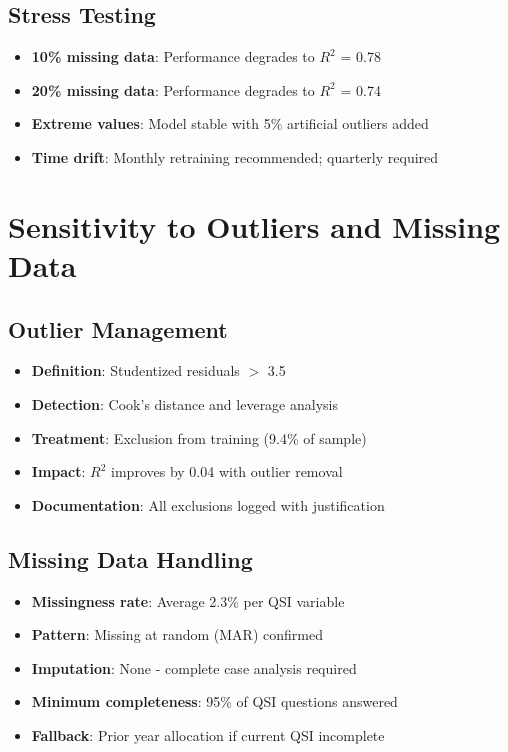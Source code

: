 \subsection{Stress Testing}

\begin{itemize}
    \item \textbf{10\% missing data}: Performance degrades to $R^2$ = 0.78
    \item \textbf{20\% missing data}: Performance degrades to $R^2$ = 0.74
    \item \textbf{Extreme values}: Model stable with 5\% artificial outliers added
    \item \textbf{Time drift}: Monthly retraining recommended; quarterly required
\end{itemize}

\section{Sensitivity to Outliers and Missing Data}

\subsection{Outlier Management}

\begin{itemize}
    \item \textbf{Definition}: Studentized residuals $>$ 3.5
    \item \textbf{Detection}: Cook's distance and leverage analysis
    \item \textbf{Treatment}: Exclusion from training (9.4\% of sample)
    \item \textbf{Impact}: $R^2$ improves by 0.04 with outlier removal
    \item \textbf{Documentation}: All exclusions logged with justification
\end{itemize}

\subsection{Missing Data Handling}

\begin{itemize}
    \item \textbf{Missingness rate}: Average 2.3\% per QSI variable
    \item \textbf{Pattern}: Missing at random (MAR) confirmed
    \item \textbf{Imputation}: None - complete case analysis required
    \item \textbf{Minimum completeness}: 95\% of QSI questions answered
    \item \textbf{Fallback}: Prior year allocation if current QSI incomplete
\end{itemize}

